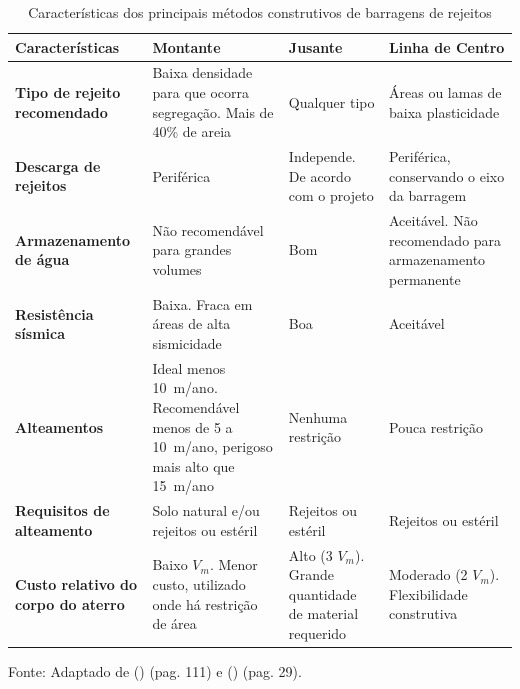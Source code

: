 \begin{table}[h!]
    \centering
    \caption{Características dos principais métodos construtivos de barragens de rejeitos}
    \label{tab:caracteristicas_barragens}
    \begin{tabular}{|p{3.8cm}|p{3.3cm}|p{3.3cm}|p{3.3cm}|}
        \hline
        \textbf{Características} & 
        \textbf{Montante} & 
        \textbf{Jusante} & 
        \textbf{Linha de Centro} \\
        \hline
        \textbf{Tipo de rejeito recomendado} & 
        Baixa densidade para que ocorra segregação. Mais de 40\% de areia & 
        Qualquer tipo & 
        Áreas ou lamas de baixa plasticidade \\
        \hline
        \textbf{Descarga de rejeitos} & 
        Periférica & 
        Independe. De acordo com o projeto & 
        Periférica, conservando o eixo da barragem \\
        \hline
        \textbf{Armazenamento de água} & 
        Não recomendável para grandes volumes & 
        Bom & 
        Aceitável. Não recomendado para armazenamento permanente \\
        \hline
        \textbf{Resistência sísmica} & 
        Baixa. Fraca em áreas de alta sismicidade & 
        Boa & 
        Aceitável \\
        \hline
        \textbf{Alteamentos} & 
        Ideal menos 10~m/ano. Recomendável menos de 5 a 10~m/ano, perigoso mais alto que 15~m/ano & 
        Nenhuma restrição & 
        Pouca restrição \\
        \hline
        \textbf{Requisitos de alteamento} & 
        Solo natural e/ou rejeitos ou estéril & 
        Rejeitos ou estéril & 
        Rejeitos ou estéril \\
        \hline
        \textbf{Custo relativo do corpo do aterro} & 
        Baixo $V_m$. Menor custo, utilizado onde há restrição de área & 
        Alto (3 $V_m$). Grande quantidade de material requerido & 
        Moderado (2 $V_m$). Flexibilidade construtiva \\
        \hline
    \end{tabular}
    \footnotesize
    Fonte: Adaptado de \citeauthor{freire2020} (\citeyear{freire2020}) (pag. 111) e \citeauthor{lozano2006} (\citeyear{lozano2006}) (pag. 29).
\end{table}


